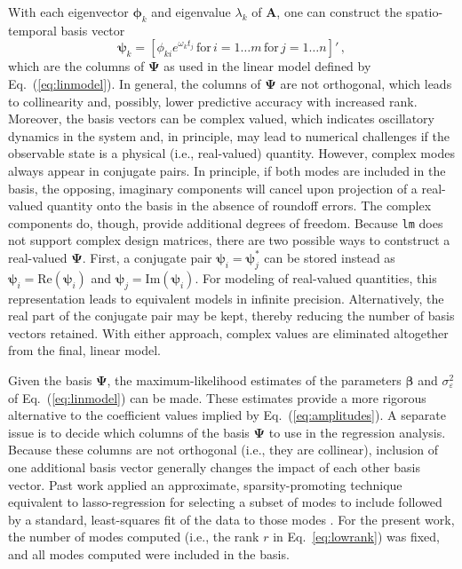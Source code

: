\documentclass[review,number,sort&compress,12pt]{elsarticle}
\begin{document}
With each eigenvector $\boldsymbol{\phi}_k$ and eigenvalue $\lambda_k$ of $\mathbf{A}$, one can construct the spatio-temporal basis vector
\begin{equation}
  \boldsymbol{\psi}_k = 
    [\phi_{ki} e^{\omega_k t_j} \, \text{for} \, i =1\ldots m \, \text{for} \, j = 1\ldots n]' \, ,
\end{equation}
which are the columns of $\boldsymbol{\Psi}$ as used in the linear model defined by Eq.~(\ref{eq:linmodel}).
In general, the columns of $\boldsymbol{\Psi}$ are not orthogonal, which leads to collinearity and, possibly, lower predictive accuracy with increased rank.  
Moreover, the basis vectors can be complex valued, which indicates oscillatory dynamics in the system and, in principle, may lead to  numerical challenges if the observable state is a physical (i.e., real-valued) quantity.
However, complex modes always appear in conjugate pairs. 
In principle, if both modes are included in the basis, the opposing, imaginary components will cancel upon projection of a real-valued quantity onto the basis in the absence of roundoff errors.
The complex components do, though, provide additional degrees of freedom.
Because {\tt lm} does not support complex design matrices, there are two possible ways to contstruct a real-valued $\boldsymbol{\Psi}$.
First, a conjugate pair $\boldsymbol{\psi}_i = \boldsymbol{\psi}^*_j$ can be stored instead as $\boldsymbol{\psi}_i = \text{Re}(\boldsymbol{\psi}_i)$ and $\boldsymbol{\psi}_j = \text{Im}(\boldsymbol{\psi}_i)$.
For modeling of real-valued quantities, this representation leads to equivalent models in infinite precision.
Alternatively, the real part of the conjugate pair may be kept, thereby reducing the number of basis vectors retained.  
With either approach, complex values are eliminated altogether from the final, linear model.


Given the basis $\boldsymbol{\Psi}$, the maximum-likelihood estimates of the parameters $\boldsymbol{\beta}$ and $\sigma^2_{\varepsilon}$ of Eq.~(\ref{eq:linmodel}) can be made.
These estimates provide a more rigorous alternative to the coefficient values implied by Eq.~(\ref{eq:amplitudes}).  
A separate issue is to decide which columns of the basis $\boldsymbol{\Psi}$ to use in the regression analysis.
Because these columns are not orthogonal (i.e., they are collinear), inclusion of one additional basis vector generally changes the impact of each other basis vector.
Past work applied an approximate, sparsity-promoting technique equivalent to lasso-regression for selecting a subset of modes to include followed by a standard, least-squares fit of the data to those modes \cite{jovanovic}.
For the present work, the number of modes computed (i.e., the rank $r$ in Eq.~\ref{eq:lowrank}) was fixed, and all modes computed were included in the basis.
\end{document}
